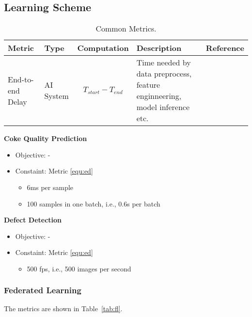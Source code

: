 \subsection{Learning Scheme}


\begin{table}[h]
\caption{Common Metrics.} 
\label{tab:common}
\begin{tabular}{|l|l|p{3cm}|p{4cm}|p{4cm}|}
\hline
Metric                 & Type      & Computation & Description                                                                & Reference \\ \hline
End-to-end Delay
& AI System 
& 
\parbox{3cm}{
    \begin{equation} \label{equ:ed} 
    T_{start} - T_{end}
    \end{equation}
}
& Time needed by data preprocess, feature enginneering, model inference etc. 
&           
\\ \hline

\end{tabular}
\end{table}


\noindent \textbf{Coke Quality Prediction}
\begin{itemize}
    \item Objective: - 
    \item Constaint: Metric \ref{equ:ed}
        \begin{itemize} 
        \item 6ms per sample 
        \item 100 samples in one batch, i.e., 0.6s per batch
        \end{itemize}
\end{itemize}

\noindent \textbf{Defect Detection}
\begin{itemize}
    \item Objective: - 
    \item Constaint: Metric \ref{equ:ed}
        \begin{itemize} 
        \item 500 fps, i.e., 500 images per second 
        \end{itemize}
\end{itemize}

\subsubsection{Federated Learning}

The metrics are shown in Table~\ref{tab:fl}.


